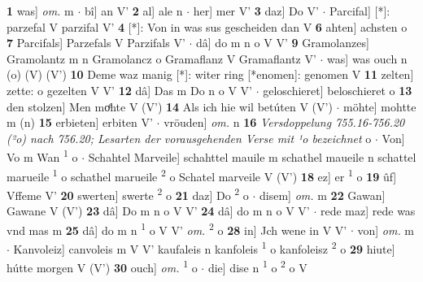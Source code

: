 \documentclass[8pt,a4paper,notitlepage]{article}
\begin{document}
\begin{table}[ht]
\begin{minipage}[t]{0.5\linewidth}
\textbf{1} was] \textit{om.} m  $\cdot$ bî] an V' \textbf{2} al] ale n  $\cdot$ her] mer V' \textbf{3} daz] Do V'  $\cdot$ Parcifal] [*]: parzefal V parzifal V' \textbf{4} [*]: Von in was sus gescheiden dan V \textbf{6} ahten] achsten o \textbf{7} Parcifals] Parzefals V Parzifals V'  $\cdot$ dâ] do m n o V V' \textbf{9} Gramolanzes] Gramolantz m n Gramolancz o Gramaflanz V Gramaflantz V'  $\cdot$ was] was ouch n (o) (V) (V') \textbf{10} Deme waz manig [*]: witer ring [*enomen]: genomen V \textbf{11} zelten] zette: o gezelten V V' \textbf{12} dâ] Das m Do n o V V'  $\cdot$ geloschieret] beloschieret o \textbf{13} den stolzen] Men moͤhte V (V') \textbf{14} Als ich hie wil betúten V (V')  $\cdot$ möhte] mohtte m (n) \textbf{15} erbieten] erbiten V'  $\cdot$ vröuden] \textit{om.} n \textbf{16} \textit{Versdoppelung 755.16-756.20 (²o) nach 756.20; Lesarten der vorausgehenden Verse mit ¹o bezeichnet} o   $\cdot$ Von] Vo m Wan \textsuperscript{1}\hspace{-1.3mm} o  $\cdot$ Schahtel Marveile] schahttel mauile m schathel maueile n schattel marueile \textsuperscript{1}\hspace{-1.3mm} o schathel marueile \textsuperscript{2}\hspace{-1.3mm} o Schatel marveile V (V') \textbf{18} ez] er \textsuperscript{1}\hspace{-1.3mm} o \textbf{19} ûf] Vffeme V' \textbf{20} swerten] swerte \textsuperscript{2}\hspace{-1.3mm} o \textbf{21} daz] Do \textsuperscript{2}\hspace{-1.3mm} o  $\cdot$ disem] \textit{om.} m \textbf{22} Gawan] Gawane V (V') \textbf{23} dâ] Do m n o V V' \textbf{24} dâ] do m n o V V'  $\cdot$ rede maz] rede was vnd mas m \textbf{25} dâ] do m n \textsuperscript{1}\hspace{-1.3mm} o V V' \textit{om.} \textsuperscript{2}\hspace{-1.3mm} o \textbf{28} in] Jch wene in V V'  $\cdot$ von] \textit{om.} m  $\cdot$ Kanvoleiz] canvoleis m V V' kaufaleis n kanfoleis \textsuperscript{1}\hspace{-1.3mm} o kanfoleisz \textsuperscript{2}\hspace{-1.3mm} o \textbf{29} hiute] hútte morgen V (V') \textbf{30} ouch] \textit{om.} \textsuperscript{1}\hspace{-1.3mm} o  $\cdot$ die] dise n \textsuperscript{1}\hspace{-1.3mm} o \textsuperscript{2}\hspace{-1.3mm} o V \newline
\end{minipage}
\end{table}
\end{document}
